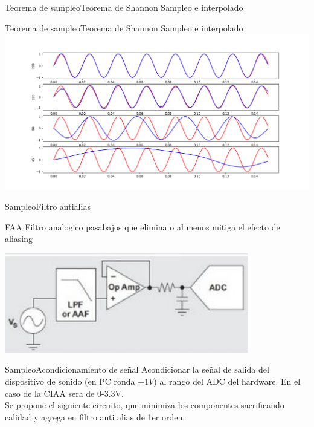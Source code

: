\begin{darkframes}
\begin{frame}{Teorema de sampleo}{Teorema de Shannon}
         \handsonicon
         Sampleo e interpolado
         
         \vfill
      \end{frame}
      \begin{frame}{Teorema de sampleo}{Teorema de Shannon}
         \handsonicon
         Sampleo e interpolado
         \center\includegraphics[width=1.0\textwidth]{1_clase/teorema_sampleo_interpolado}
         \vfill
      \end{frame}
      \begin{frame}{Sampleo}{Filtro antialias}
         \begin{block}{FAA}
            Filtro \alert{analogico} pasabajos que elimina o al menos mitiga el efecto de aliasing
         \end{block}
         \center\includegraphics[width=0.8\textwidth]{1_clase/filtro_anti_aliasing}
         \vfill
      \end{frame}
      \begin{frame}{Sampleo}{Acondicionamiento de señal}
         Acondicionar la señal de salida del dispositivo de sonido (en PC ronda $\pm1V$) al rango del ADC del hardware. En el caso de la CIAA sera de 0-3.3V. \\ Se propone el siguiente circuito, que minimiza los componentes sacrificando calidad y agrega en filtro anti alias de 1er orden.

\end{frame}
\end{darkframes}
